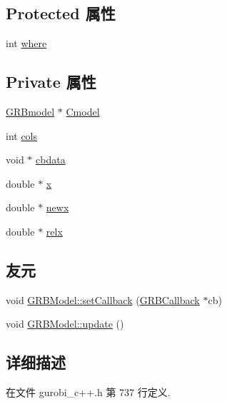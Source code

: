 \subsection*{Protected 属性}
\begin{DoxyCompactItemize}
\item 
int \hyperlink{classGRBCallback_ac3a80ef6ca81a5503751de0555281fa9}{where}
\end{DoxyCompactItemize}
\subsection*{Private 属性}
\begin{DoxyCompactItemize}
\item 
\hyperlink{gurobi__c_8h_a865e461c79c88bc5c0d5f56087ae4876}{G\+R\+Bmodel} $\ast$ \hyperlink{classGRBCallback_a3fb7b1f730273f41f676585d623da030}{Cmodel}
\item 
int \hyperlink{classGRBCallback_a8f9edc33ac248fb72f07ade41918487f}{cols}
\item 
void $\ast$ \hyperlink{classGRBCallback_ae185005e911df996d486a7ee3f106424}{cbdata}
\item 
double $\ast$ \hyperlink{classGRBCallback_a3e658eed900f01b7f77e931b136f5ff7}{x}
\item 
double $\ast$ \hyperlink{classGRBCallback_ad4d2d0181047f6cbc91775f09da1b44e}{newx}
\item 
double $\ast$ \hyperlink{classGRBCallback_a345d6000f8cd0b97e59d6dc1f908250c}{relx}
\end{DoxyCompactItemize}
\subsection*{友元}
\begin{DoxyCompactItemize}
\item 
void \hyperlink{classGRBCallback_ab51e7bab6b848387ff0705a2af377a4e}{G\+R\+B\+Model\+::set\+Callback} (\hyperlink{classGRBCallback}{G\+R\+B\+Callback} $\ast$cb)
\item 
void \hyperlink{classGRBCallback_a160ecdebd0c7715238fedba69f5c01f4}{G\+R\+B\+Model\+::update} ()
\end{DoxyCompactItemize}


\subsection{详细描述}


在文件 gurobi\+\_\+c++.\+h 第 737 行定义.



